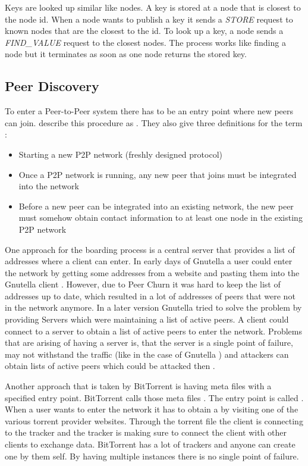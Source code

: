 Keys are  looked up similar like nodes. A key is stored at a node that is closest to the node id. When a node wants to publish a key it sends a \textit{STORE} request to known nodes that are the closest to the id.
To look up a key, a node sends a \textit{FIND\_VALUE} request to the closest nodes. The process works like finding a node but it terminates as soon as one node returns the stored key.

\subsection{Peer Discovery}
To enter a Peer-to-Peer system there has to be an entry point where new peers can join. 
\citet{p2p-bootstrapping} describe this procedure as . 
They also give three definitions for the term :
\begin{itemize}
        \item Starting a new P2P network (freshly designed protocol)
        \item Once a P2P network is running, any new peer that joins must be integrated into the network
        \item Before a new peer can be integrated into an existing network, the new peer must somehow obtain contact information to at least one node in the existing P2P network
\end{itemize}
\citet[p. 3]{p2p-bootstrapping}

One approach for the boarding process is a central server that provides a list of addresses where a client can enter. In early days of Gnutella a user could enter the network by getting some addresses from a website and pasting them into the Gnutella client \cite[\S3.2]{gnutellaAnalysis}. However, due to Peer Churn it was hard to keep the list of addresses up to date, which resulted in a lot of addresses of peers that were not in the network anymore. In a later version Gnutella tried to solve the problem by providing  Servers which were maintaining a list of active peers. A client could connect to a  server to obtain a list of active peers to enter the network. Problems that are arising of having a server is, that the server is a single point of failure, may not withstand the traffic (like in the case of Gnutella \cite[\S3.2]{gnutellaAnalysis}) and attackers can obtain lists of active peers which could be attacked then \cite[p. 7]{p2p-bootstrapping}.

Another approach that is taken by BitTorrent is having meta files with a specified entry point. BitTorrent calls those meta files . The entry point is called . When a user wants to enter the network it has to obtain a  by visiting one of the various torrent provider websites. Through the torrent file the client is connecting to the tracker and the tracker is making sure to connect the client with other clients to exchange data. BitTorrent has a lot of trackers and anyone can create one by them self. By having multiple instances there is no single point of failure.

